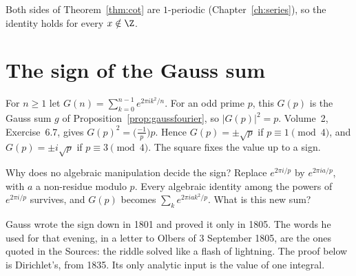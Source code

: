 Both sides of Theorem~\ref{thm:cot} are $1$-periodic (Chapter~\ref{ch:series}), so the identity holds for every $x\notin\Z$.

\section{The sign of the Gauss sum}

For $n\ge1$ let $G(n)=\sum_{k=0}^{n-1}e^{2\pi ik^2/n}$. For an odd prime $p$, this $G(p)$ is the Gauss sum $g$ of Proposition~\ref{prop:gaussfourier}, so $|G(p)|^2=p$. Volume~2, Exercise~6.7, gives $G(p)^2=\bigl(\frac{-1}p\bigr)p$. Hence $G(p)=\pm\sqrt p$ if $p\equiv1\pmod4$, and $G(p)=\pm i\sqrt p$ if $p\equiv3\pmod4$. The square fixes the value up to a sign.

\begin{think}
Why does no algebraic manipulation decide the sign? Replace $e^{2\pi i/p}$ by $e^{2\pi ia/p}$, with $a$ a non-residue modulo $p$. Every algebraic identity among the powers of $e^{2\pi i/p}$ survives, and $G(p)$ becomes $\sum_ke^{2\pi iak^2/p}$. What is this new sum?
\end{think}

Gauss wrote the sign down in 1801 and proved it only in 1805. The words he used for that evening, in a letter to Olbers of 3 September 1805, are the ones quoted in the Sources: the riddle solved like a flash of lightning. The proof below is Dirichlet's, from 1835. Its only analytic input is the value of one integral.

